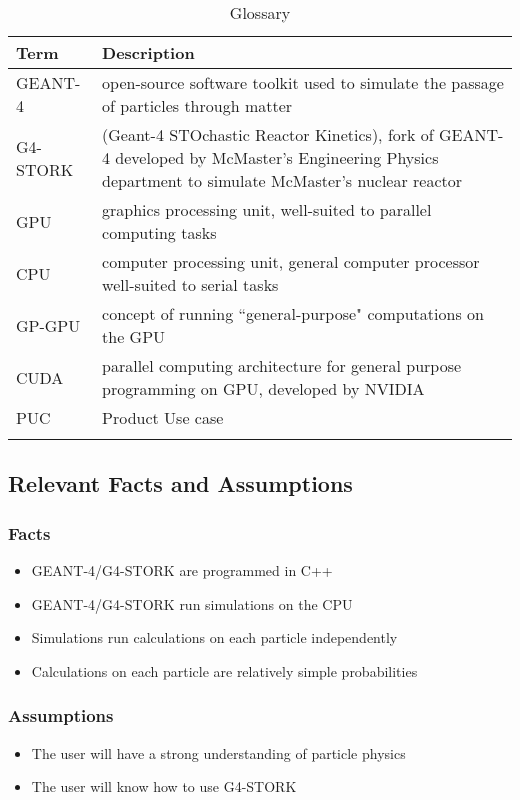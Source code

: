 \documentclass[12pt]{article}
\begin{document}
\begin{table}[h]
\centering
\caption{Glossary}
\begin{tabularx}{\textwidth}{l|X}
\Xhline{2\arrayrulewidth}
\bf Term & \bf Description\\
\hline
GEANT-4 & open-source software toolkit used to simulate the passage of particles through matter\\\hline
G4-STORK & (Geant-4 STOchastic Reactor Kinetics), fork of GEANT-4 developed by McMaster's Engineering Physics department to simulate McMaster's nuclear reactor\\\hline
GPU & graphics processing unit, well-suited to parallel computing tasks\\\hline
CPU & computer processing unit, general computer processor well-suited to serial tasks\\\hline
GP-GPU & concept of running ``general-purpose" computations on the GPU\\\hline
CUDA & parallel computing architecture for general purpose programming on GPU, developed by NVIDIA\\\hline
PUC & Product Use case\\
\Xhline{2\arrayrulewidth}
\end{tabularx}
\end{table}

\subsection{Relevant Facts and Assumptions} %
\subsubsection{Facts}
\begin{itemize}
\item GEANT-4/G4-STORK are programmed in C++
\item GEANT-4/G4-STORK run simulations on the CPU
\item Simulations run calculations on each particle independently
\item Calculations on each particle are relatively simple probabilities
\end{itemize}

\subsubsection{Assumptions}
\begin{itemize}
\item The user will have a strong understanding of particle physics
\item The user will know how to use G4-STORK
\end{itemize}
\end{document}
